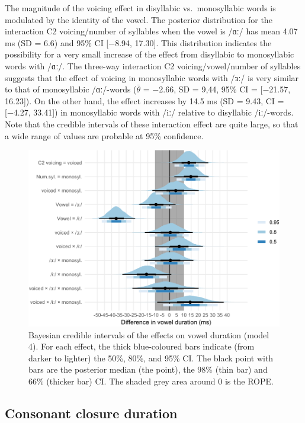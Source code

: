 \documentclass[12pt,a4paper,]{article}
\providecommand{\DIFaddtex}[1]{{\protect\color{blue}\uwave{#1}}} %
\providecommand{\DIFaddFL}[1]{\DIFadd{#1}} %
\providecommand{\DIFaddbeginFL}{} %
\providecommand{\DIFaddendFL}{} %
\providecommand{\DIFadd}[1]{\texorpdfstring{\DIFaddtex{#1}}{#1}} %
\newcommand{\DIFaddincludegraphics}[2][]{{\color{blue}\fbox{\DIFOincludegraphics[#1]{#2}}}} %
\DeclareRobustCommand{\DIFaddbeginFL}{\DIFOaddbeginFL \let\includegraphics\DIFaddincludegraphics} %
\DeclareRobustCommand{\DIFaddendFL}{\DIFOaddendFL \let\includegraphics\DIFOincludegraphics} %
\begin{document}
The magnitude of the voicing effect in disyllabic vs.~monosyllabic words
is modulated by the identity of the vowel. The posterior distribution
for the interaction C2 voicing/number of syllables when the vowel is
/ɑː/ has mean 4.07 ms (SD = 6.6) and 95\% CI {[}−8.94, 17.30{]}. This
distribution indicates the possibility for a very small increase of the
effect from disyllabic to monosyllabic words with /ɑː/. The three-way
interaction C2 voicing/vowel/number of syllables suggests that the
effect of voicing in monosyllabic words with /ɜː/ is very similar to
that of monosyllabic /ɑː/-words (\(\bar{\theta}\) = −2.66, SD = 9,44,
95\% CI = {[}−21.57, 16.23{]}). On the other hand, the effect increases
by 14.5 ms (SD = 9.43, CI = {[}−4.27, 33.41{]}) in monosyllabic words
with /iː/ relative to disyllabic /iː/-words. Note that the credible
intervals of these interaction effect are quite large, so that a wide
range of values are probable at 95\% confidence.

\begin{figure}
\includegraphics[width=\linewidth]{2019-english-rr_files/figure-latex/vow-4-intervals-1} \caption{\DIFaddbeginFL \DIFaddFL{Posterior distributions and }\DIFaddendFL Bayesian credible intervals of the effects on vowel duration (model 4). For each effect, the thick blue-coloured bars indicate (from darker to lighter) the 50\%, 80\%, and 95\% CI. The black point with bars are the posterior median (the point), the 98\% (thin bar) and 66\% (thicker bar) CI. The shaded grey area around 0 is the ROPE.}\label{f:vow-4-intervals}
\end{figure}

\hypertarget{consonant-closure-duration}{%
\subsection{Consonant closure
duration}\label{consonant-closure-duration}}
\end{document}
